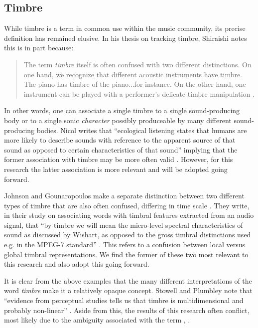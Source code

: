 \documentclass[a4paper,12pt]{report} 	%
\numberwithin{figure}{chapter}
\numberwithin{table}{chapter}
\numberwithin{equation}{chapter}
\begin{document}
\begin{flushleft}
\section{Timbre}
While timbre is a term in common use within the music community, its precise definition has remained elusive. In his thesis on tracking timbre, Shiraishi notes this is in part because:

\selectfont
\begin{quote}
The term \emph{timbre} itself is often confused with two different distinctions. On one hand, we recognize that different acoustic instruments have timbre. The piano has timbre of the piano...for instance. On the other hand, one instrument can be played with a performer's delicate timbre manipulation \cite[p. 4]{Shiraishi:2006ye}.
\end{quote}
\selectfont
In other words, one can associate a single timbre to a single sound-producing body or to a single sonic \emph{character} possibly produceable by many different sound-producing bodies. Nicol writes that ``ecological listening states that humans are more likely to describe sounds with reference to the apparent source of that sound as opposed to certain characteristics of that sound'' implying that the former association with timbre may be more often valid \cite[p. 23]{Nicol:2005rp}. However, for this research the latter association is more relevant and will be adopted going forward. 

Johnson and Gounaropoulos make a separate distinction between two different types of timbre that are also often confused, differing in time scale \cite{Johnson:2006pi}. They write, in their study on associating words with timbral features extracted from an audio signal, that ``by timbre we will mean the micro-level spectral characteristics of sound as discussed by Wishart, as opposed to the gross timbral distinctions used e.g. in the MPEG-7 standard'' \cite[p. 1]{Johnson:2006pi}. This refers to a confusion between local versus global timbral representations. We find the former of these two most relevant to this research and also adopt this going forward.

It is clear from the above examples that the many different interpretations of the word \emph{timbre} make it a relatively opaque concept. Stowell and Plumbley note that ``evidence from perceptual studies tells us that timbre is multidimensional and probably non-linear'' \cite[p. 1]{Stowell:2008qf}. Aside from this, the results of this research often conflict, most likely due to the ambiguity associated with the term \cite[p. 4]{Fiebrink:os}, \cite[p. 11]{Ciglar:2009uf}.


\end{flushleft}
\end{document}
